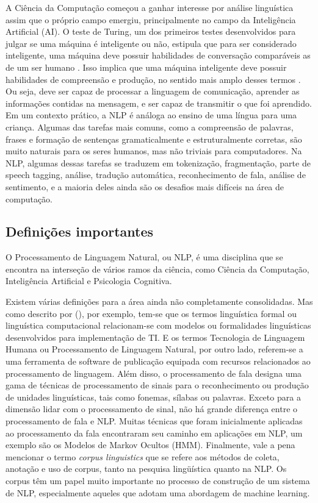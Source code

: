 \documentclass[
	12pt,				%
	openright,			%
	oneside,			%
	a4paper,			%
	english,			%
	spanish,			%
	brazil				%
	]{abntex2}
\begin{document}
A Ciência da Computação começou a ganhar interesse por análise linguística assim que o próprio campo emergiu, principalmente no campo da Inteligência Artificial (AI). O teste de Turing, um dos primeiros testes desenvolvidos para julgar se uma máquina é inteligente ou não, estipula que para ser considerado inteligente, uma máquina deve possuir habilidades de conversação comparáveis as de um ser humano \cite{turing}.  Isso implica que uma máquina inteligente deve possuir habilidades de compreensão e produção, no sentido mais amplo desses termos \cite{book_natural_lang}. Ou seja, deve ser capaz de processar a linguagem de comunicação, aprender as informações contidas na mensagem, e ser capaz de transmitir o que foi aprendido. 	
Em um contexto prático, a NLP é análoga ao ensino de uma língua para uma criança. Algumas das tarefas mais comuns, como a compreensão de palavras, frases e formação de sentenças gramaticalmente e estruturalmente corretas, são muito naturais para os seres humanos, mas não triviais para computadores. Na NLP, algumas dessas tarefas se traduzem em tokenização, fragmentação, parte de speech tagging, análise, tradução automática, reconhecimento de fala, análise de sentimento, e a maioria deles ainda são os desafios mais difíceis na área de computação\cite{book_natlang_python}.
		
	\subsection*{Definições importantes}
	O Processamento de Linguagem Natural, ou NLP, é uma disciplina que se encontra na interseção de vários ramos da ciência, como Ciência da Computação, Inteligência Artificial e Psicologia Cognitiva. 
	
Existem várias definições para a área ainda não completamente consolidadas. Mas como descrito por  \citeauthor{book_natural_lang} (\citeyear{book_natural_lank}), por exemplo, tem-se que os termos linguística formal ou linguística computacional relacionam-se com modelos ou formalidades linguísticas desenvolvidos para implementação de TI. E os termos Tecnologia de Linguagem Humana ou Processamento de Linguagem Natural, por outro lado, referem-se a uma ferramenta de software de publicação equipada com recursos relacionados ao processamento de linguagem. Além disso, o processamento de fala designa uma gama de técnicas de processamento de sinais para o reconhecimento ou produção de unidades linguísticas, tais como fonemas, sílabas ou palavras. Exceto para a dimensão lidar com o processamento de sinal, não há grande diferença entre o processamento de fala e NLP. Muitas técnicas que foram inicialmente aplicadas ao processamento da fala encontraram seu caminho em aplicações em NLP, um exemplo são os Modelos de Markov Ocultos (HMM). Finalmente, vale a pena mencionar o termo \textit{corpus linguistics}  que se refere aos métodos de coleta, anotação e uso de corpus, tanto na pesquisa lingüística quanto na NLP. Os corpus têm um papel muito importante no processo de construção de um sistema de NLP, especialmente aqueles que adotam uma abordagem de machine learning.
\end{document}
